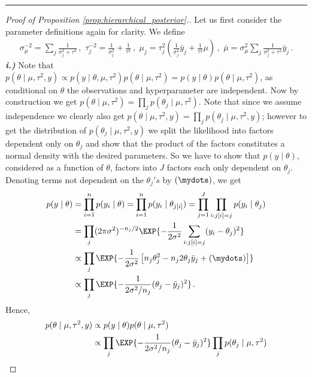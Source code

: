 \textcolor{red}{\hrule}
\begin{proof}[Proof of Proposition \ref{prop:hierarchical_posterior}.]
  Let us first consider the parameter definitions again for clarity.
  We define
  \begin{align*}
    \sigma_\mu^{-2} = \sum_j \frac{1}{\sigma_j^2 + \tau^2}\,,\,\, \tau_j^{-2}=\frac{1}{\sigma_j^2} + \frac{1}{\tau^2}\,,\,\, \mu_j=\tau_j^2(\frac{1}{\sigma_j^2} \bar{y}_j + \frac{1}{\tau^2}\mu) \,,\,\, \bar{\mu} = \sigma_\mu^2 \sum_j \frac{1}{\sigma_j^2 + \tau^2} \bar{y}_j \,.
  \end{align*}
  \noindent
  \textbf{\emph{i.)}} Note that $p(\theta \mid \mu, \tau^2, y) \propto p(y \mid \theta, \mu, \tau^2) p(\theta \mid \mu, \tau^2) = p(y \mid \theta) p(\theta \mid \mu, \tau^2)$, as conditional on $\theta$ the observations and hyperparameter are independent.
  Now by construction we get $p(\theta \mid \mu, \tau^2) = \prod_j p(\theta_j \mid \mu, \tau^2)$.
  Note that since we assume independence we clearly also get $p(\theta \mid \mu, \tau^2, y) = \prod_j p(\theta_j \mid \mu, \tau^2, y)$; however to get the distribution of $p(\theta_j \mid \mu, \tau^2, y)$ we split the likelihood into factors dependent only on $\theta_j$ and show that the product of the factors constitutes a normal density with the desired parameters.
  So we have to show that $p(y \mid \theta)$, considered as a function of $\theta$, factors into $J$ factors each only dependent on $\theta_j$.
  Denoting terms not dependent on the $\theta_j's$ by $(\mydots)$, we get
  \begin{align*}
    p(y \mid \theta) &= \prod_{i=1}^n p(y_i \mid \theta)=\prod_{i=1}^n p(y_i \mid \theta_{j[i]}) = \prod_{j=1}^J \prod_{i:j[i]=j} p(y_i \mid \theta_{j})\\
    &= \prod_j (2 \pi \sigma^2)^{-n_j / 2} \EXP{-\frac{1}{2\sigma^2}\sum_{i:j[i]=j} (y_i - \theta_j)^2}\\
    &\propto \prod_j \EXP{-\frac{1}{2\sigma^2} \left[n_j \theta_j^2 - n_j 2\theta_j\bar{y}_j + (\mydots)\right]}\\
    &\propto \prod_j \EXP{-\frac{1}{2\sigma^2 / n_j} (\theta_j - \bar{y}_j)^2} \,.
  \end{align*}
  Hence,
  \begin{align*}
    p(\theta \mid \mu, \tau^2, y) &\propto p(y \mid \theta) p(\theta \mid \mu, \tau^2)\\
    &\propto \prod_j \EXP{-\frac{1}{2\sigma^2 / n_j} (\theta_j - \bar{y}_j)^2} \prod_j p(\theta_j \mid \mu, \tau^2)\\

\end{align*}
\end{proof}
